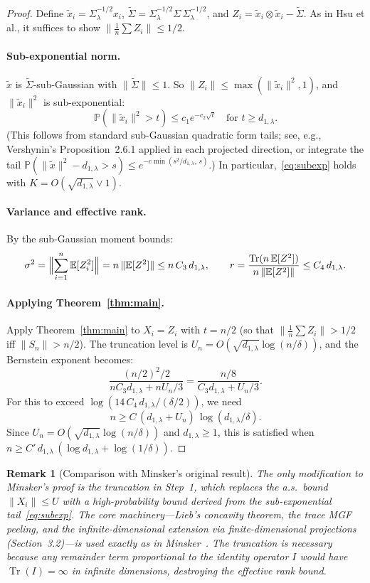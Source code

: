 \documentclass[11pt]{article}
\newtheorem{remark}[theorem]{Remark}
\DeclareMathOperator{\Tr}{Tr}
\newcommand{\E}{\mathbb{E}}
\newcommand{\PP}{\mathbb{P}}
\newcommand{\norm}[1]{\|#1\|}
\begin{document}
\begin{proof}
Define $\tilde x_i=\Sigma_\lambda^{-1/2}x_i$, $\tilde\Sigma=\Sigma_\lambda^{-1/2}\Sigma\,\Sigma_\lambda^{-1/2}$, and $Z_i=\tilde x_i\otimes\tilde x_i-\tilde\Sigma$. As in Hsu et al., it suffices to show $\norm{\frac{1}{n}\sum Z_i}\leq 1/2$.

\paragraph{Sub-exponential norm.}
$\tilde x$ is $\tilde\Sigma$-sub-Gaussian with $\norm{\tilde\Sigma}\leq 1$. So $\norm{Z_i}\leq\max(\norm{\tilde x_i}^2,1)$, and $\norm{\tilde x_i}^2$ is sub-exponential:
\[
\PP(\norm{\tilde x_i}^2>t)\leq c_1 e^{-c_2\sqrt{t}}\quad\text{for }t\geq d_{1,\lambda}.
\]
(This follows from standard sub-Gaussian quadratic form tails; see, e.g., Vershynin's Proposition~2.6.1 applied in each projected direction, or integrate the tail $\PP(\norm{\tilde x}^2 - d_{1,\lambda} > s)\leq e^{-c\min(s^2/d_{1,\lambda},\,s)}$.) In particular,~\eqref{eq:subexp} holds with $K=O(\sqrt{d_{1,\lambda}}\vee 1)$.

\paragraph{Variance and effective rank.}
By the sub-Gaussian moment bounds:
\[
\sigma^2=\Bigl\|\sum_{i=1}^n\E[Z_i^2]\Bigr\|=n\,\norm{\E[Z^2]}\leq n\,C_3\,d_{1,\lambda},\qquad
r = \frac{\Tr(n\,\E[Z^2])}{n\,\norm{\E[Z^2]}}\leq C_4\,d_{1,\lambda}.
\]

\paragraph{Applying Theorem~\ref{thm:main}.}
Apply Theorem~\ref{thm:main} to $X_i=Z_i$ with $t=n/2$ (so that $\norm{\frac{1}{n}\sum Z_i}> 1/2$ iff $\norm{S_n}>n/2$). The truncation level is $U_n=O(\sqrt{d_{1,\lambda}}\log(n/\delta))$, and the Bernstein exponent becomes:
\[
\frac{(n/2)^2/2}{nC_3 d_{1,\lambda}+nU_n/3}
= \frac{n/8}{C_3 d_{1,\lambda}+U_n/3}.
\]
For this to exceed $\log(14\,C_4\,d_{1,\lambda}/(\delta/2))$, we need
\[
n\geq C\,(d_{1,\lambda}+U_n)\,\log(d_{1,\lambda}/\delta).
\]
Since $U_n=O(\sqrt{d_{1,\lambda}}\log(n/\delta))$ and $d_{1,\lambda}\geq 1$, this is satisfied when $n\geq C'\,d_{1,\lambda}\,(\log d_{1,\lambda}+\log(1/\delta))$.
\end{proof}

\begin{remark}[Comparison with Minsker's original result]
The only modification to Minsker's proof is the truncation in Step~1, which replaces the a.s.\ bound $\norm{X_i}\leq U$ with a high-probability bound derived from the sub-exponential tail~\eqref{eq:subexp}. The core machinery---Lieb's concavity theorem, the trace MGF peeling, and the infinite-dimensional extension via finite-dimensional projections (Section~3.2)---is used exactly as in Minsker~\cite{Minsker17}. The truncation is necessary because any remainder term proportional to the identity operator $I$ would have $\Tr(I)=\infty$ in infinite dimensions, destroying the effective rank bound.
\end{remark}
\end{document}
